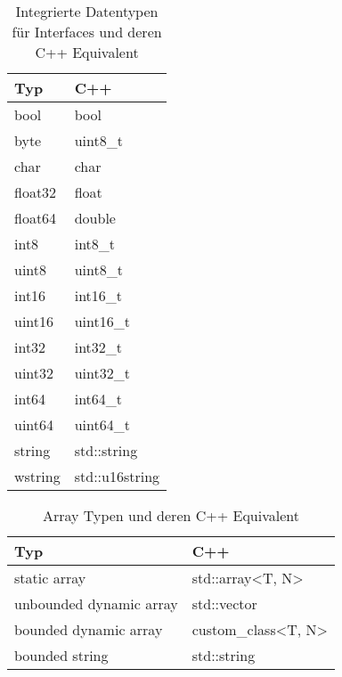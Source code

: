 \begin{table}[ht]
    \centering
    \caption{Integrierte Datentypen für Interfaces und deren C++ Equivalent}
\begin{tabular}{|l|l|}
\hline
\textbf{Typ} & \textbf{C++}   \\ \hline
bool         & bool           \\ \hline
byte         & uint8\_t       \\ \hline
char         & char           \\ \hline
float32      & float          \\ \hline
float64      & double         \\ \hline
int8         & int8\_t        \\ \hline
uint8        & uint8\_t       \\ \hline
int16        & int16\_t       \\ \hline
uint16       & uint16\_t      \\ \hline
int32        & int32\_t       \\ \hline
uint32       & uint32\_t      \\ \hline
int64        & int64\_t       \\ \hline
uint64       & uint64\_t      \\ \hline
string       & std::string    \\ \hline
wstring      & std::u16string \\ \hline
\end{tabular}
    \label{tab:builtintypes}
\end{table}
\begin{table}[ht]
    \centering
    \caption{Array Typen und deren C++ Equivalent}
\begin{tabular}{|l|l|}
\hline
\textbf{Typ} & \textbf{C++}   \\ \hline
static array               & std::array<T, N>   \\ \hline
unbounded dynamic array    & std::vector        \\ \hline
bounded dynamic array      & custom\_class<T, N> \\ \hline
bounded string             & std::string        \\ \hline
\end{tabular}
    \label{tab:arraytypes}
\end{table}
